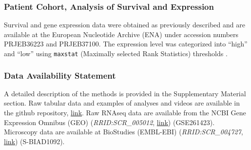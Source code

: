 \subsubsection*{Patient Cohort, Analysis of Survival and Expression}%
\label{C1:methods_patientcohort}%
Survival and gene expression data were obtained as previously described
\cite{seckingerTargetExpressionGeneration2017b, seckingerCD38ImmunotherapeuticTarget2018}
and are available at the European Nucleotide Archive (ENA) under accession
numbers PRJEB36223 and PRJEB37100. The expression level was categorized into
``high'' and ``low'' using \texttt{maxstat} (Maximally selected Rank Statistics)
thresholds \cite{hothornMaximallySelectedRank2017}.


\subsubsection*{Data Availability Statement}%
\label{C1:methods_dataavailability}%
A detailed description of the methods is provided in the Supplementary Material section. Raw
tabular data and examples of analyses and videos are available in the github repository, \href{https://github.com/markur4/Supplemental-INA-6-Subpopulations-and-Aggregation-Detachment-Dynamics}{link}.
Raw RNAseq data are available from the NCBI Gene Expression Omnibus (GEO)
(\textit{RRID:SCR\_005012}, \href{https://www.ncbi.nlm.nih.gov/geo/query/acc.cgi?acc=GSE261423}{link}) (GSE261423). Microscopy data are available at BioStudies
(EMBL-EBI) (\textit{RRID:SCR\_004727}, \href{https://www.ebi.ac.uk/biostudies/bioimages/studies/S-BIAD1092?key=69bafe9c-74ff-492b-9e68-bd42655c4d1b}{link}) (S-BIAD1092).



